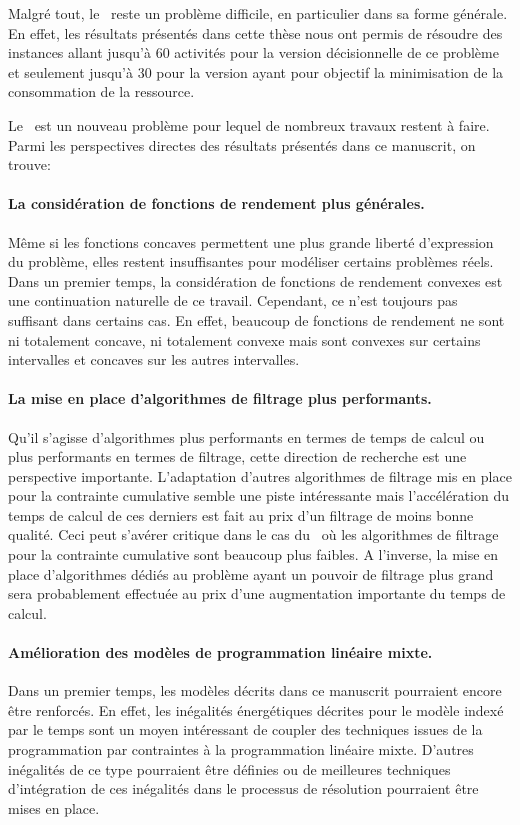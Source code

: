 Malgré tout, le \CECSP~reste un problème difficile, en particulier
dans sa forme générale. En effet, les résultats présentés dans cette
thèse nous ont permis de résoudre des instances allant jusqu'à $60$
activités pour la version décisionnelle de ce problème et seulement
jusqu'à $30$ pour la version ayant pour objectif la minimisation de la
consommation de la ressource. 

Le \CECSP~est un nouveau problème pour lequel de nombreux travaux
restent à faire. Parmi les perspectives directes des résultats
présentés dans ce manuscrit, on trouve:
\paragraph{La considération de fonctions de rendement plus générales.} Même si les fonctions concaves permettent une plus grande
  liberté d'expression du problème, elles restent insuffisantes pour
  modéliser certains problèmes réels. Dans un premier temps, la
  considération de fonctions de rendement convexes est une
  continuation naturelle de ce travail. Cependant, ce n'est toujours
  pas suffisant dans certains cas. En effet, beaucoup de fonctions 
  de rendement ne sont ni totalement concave, ni totalement convexe
  mais sont convexes sur certains intervalles et concaves sur les
  autres intervalles. 

\paragraph{La mise en place d'algorithmes de filtrage plus
  performants.} Qu'il s'agisse d'algorithmes plus performants en termes
de temps de calcul ou plus performants en termes de filtrage, cette
direction de recherche est une perspective importante. L'adaptation
d'autres algorithmes de filtrage mis en place pour la contrainte
cumulative semble une piste intéressante mais l'accélération du temps
de calcul de ces derniers est fait au prix d'un filtrage de moins
bonne qualité. Ceci peut s'avérer critique dans le cas du \CECSP~où
les algorithmes de filtrage pour la contrainte cumulative sont
beaucoup plus faibles. A l'inverse, la mise en place d'algorithmes
dédiés au problème ayant un pouvoir de filtrage plus grand sera
probablement effectuée au prix d'une augmentation importante du temps 
de calcul. 

\paragraph{Amélioration des modèles de programmation linéaire mixte.}
Dans un premier temps, les modèles décrits dans ce manuscrit
pourraient encore être renforcés. En effet, les inégalités
énergétiques décrites pour le modèle indexé par le temps sont un moyen
intéressant de coupler des techniques issues de la programmation par
contraintes à la programmation linéaire mixte. D'autres inégalités de
ce type pourraient être définies ou de meilleures techniques
d'intégration de ces inégalités dans le processus de résolution
pourraient être mises en place. 

